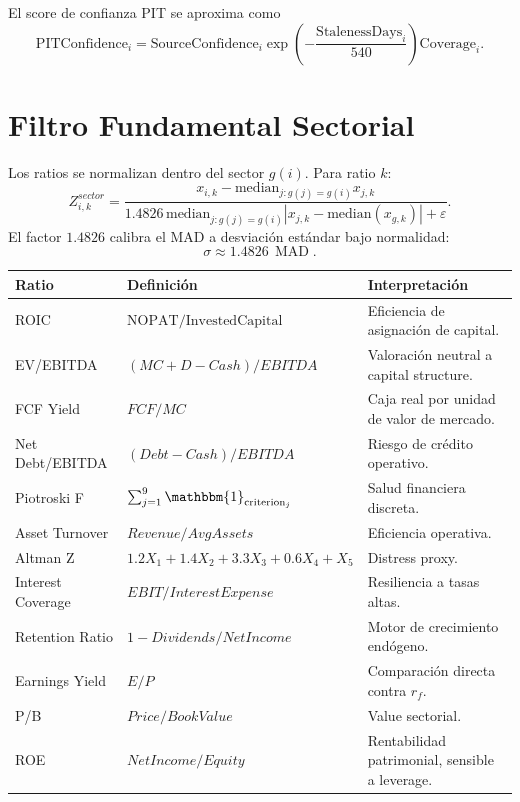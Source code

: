 \documentclass[11pt,letterpaper]{article}
\DeclareMathOperator{\MAD}{MAD}
\newcommand{\1}{\mathbbm{1}}
\begin{document}
El score de confianza PIT se aproxima como
\[
  \mathrm{PITConfidence}_{i}
  =
  \mathrm{SourceConfidence}_{i}
  \exp\left(-\frac{\mathrm{StalenessDays}_{i}}{540}\right)
  \mathrm{Coverage}_{i}.
\]

\section{Filtro Fundamental Sectorial}

Los ratios se normalizan dentro del sector \(g(i)\). Para ratio \(k\):
\[
Z_{i,k}^{sector}
=
\frac{x_{i,k}-\mathrm{median}_{j:g(j)=g(i)}x_{j,k}}
{1.4826\,\mathrm{median}_{j:g(j)=g(i)}
\left|x_{j,k}-\mathrm{median}(x_{g,k})\right|+\varepsilon}.
\]
El factor \(1.4826\) calibra el MAD a desviación estándar bajo normalidad:
\[
  \sigma\approx 1.4826\,\MAD.
\]

\begin{longtable}{p{}p{}p{}}
\toprule
\textbf{Ratio} & \textbf{Definición} & \textbf{Interpretación}\\
\midrule
ROIC & \(\mathrm{NOPAT}/\mathrm{InvestedCapital}\) & Eficiencia de asignación de capital.\\
EV/EBITDA & \((MC+D-Cash)/EBITDA\) & Valoración neutral a capital structure.\\
FCF Yield & \(FCF/MC\) & Caja real por unidad de valor de mercado.\\
Net Debt/EBITDA & \((Debt-Cash)/EBITDA\) & Riesgo de crédito operativo.\\
Piotroski F & \(\sum_{j=1}^9 \1_{\mathrm{criterion}_j}\) & Salud financiera discreta.\\
Asset Turnover & \(Revenue/AvgAssets\) & Eficiencia operativa.\\
Altman Z & \(1.2X_1+1.4X_2+3.3X_3+0.6X_4+X_5\) & Distress proxy.\\
Interest Coverage & \(EBIT/InterestExpense\) & Resiliencia a tasas altas.\\
Retention Ratio & \(1-Dividends/NetIncome\) & Motor de crecimiento endógeno.\\
Earnings Yield & \(E/P\) & Comparación directa contra \(r_f\).\\
P/B & \(Price/BookValue\) & Value sectorial.\\
ROE & \(NetIncome/Equity\) & Rentabilidad patrimonial, sensible a leverage.\\
\bottomrule
\end{longtable}
\end{document}
